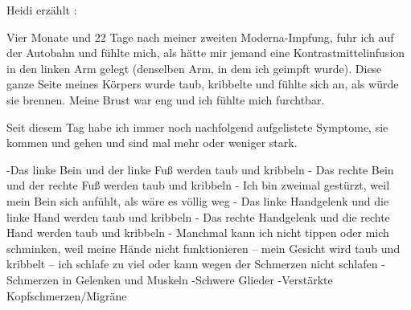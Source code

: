 Heidi erzählt :

Vier Monate und 22 Tage nach meiner zweiten Moderna-Impfung, fuhr ich auf der
Autobahn und fühlte mich, als hätte mir jemand eine Kontrastmittelinfusion in
den linken Arm gelegt (denselben Arm, in dem ich geimpft wurde). Diese ganze
Seite meines Körpers wurde taub, kribbelte und fühlte sich an, als würde sie
brennen. Meine Brust war eng und ich fühlte mich furchtbar.

Seit diesem Tag habe ich immer noch nachfolgend aufgelistete Symptome, sie
kommen und gehen und sind mal mehr oder weniger stark.

-Das linke Bein und der linke Fuß werden taub und kribbeln - Das rechte Bein und
der rechte Fuß werden taub und kribbeln - Ich bin zweimal gestürzt, weil mein
Bein sich anfühlt, als wäre es völlig weg - Das linke Handgelenk und die linke
Hand werden taub und kribbeln - Das rechte Handgelenk und die rechte Hand werden
taub und kribbeln - Manchmal kann ich nicht tippen oder mich schminken, weil
meine Hände nicht funktionieren – mein Gesicht wird taub und kribbelt – ich
schlafe zu viel oder kann wegen der Schmerzen nicht schlafen -Schmerzen in
Gelenken und Muskeln -Schwere Glieder -Verstärkte Kopfschmerzen/Migräne
